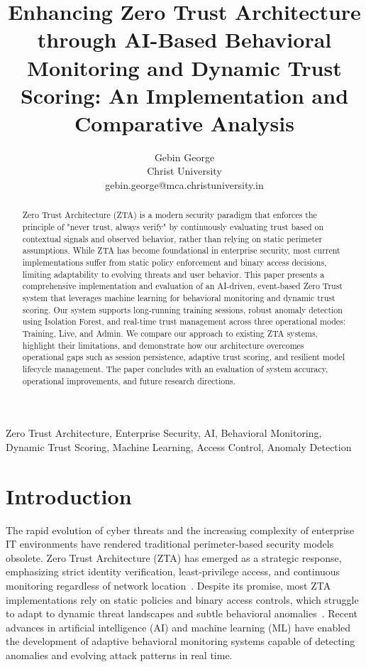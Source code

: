 \documentclass[conference]{IEEEtran}
\begin{document}
\title{Enhancing Zero Trust Architecture through AI-Based Behavioral Monitoring and Dynamic Trust Scoring: An Implementation and Comparative Analysis}

\author{Gebin George\\Christ University\\gebin.george@mca.christuniversity.in}

\maketitle

\begin{abstract}
Zero Trust Architecture (ZTA) is a modern security paradigm that enforces the principle of "never trust, always verify" by continuously evaluating trust based on contextual signals and observed behavior, rather than relying on static perimeter assumptions. While ZTA has become foundational in enterprise security, most current implementations suffer from static policy enforcement and binary access decisions, limiting adaptability to evolving threats and user behavior. This paper presents a comprehensive implementation and evaluation of an AI-driven, event-based Zero Trust system that leverages machine learning for behavioral monitoring and dynamic trust scoring. Our system supports long-running training sessions, robust anomaly detection using Isolation Forest, and real-time trust management across three operational modes: Training, Live, and Admin. We compare our approach to existing ZTA systems, highlight their limitations, and demonstrate how our architecture overcomes operational gaps such as session persistence, adaptive trust scoring, and resilient model lifecycle management. The paper concludes with an evaluation of system accuracy, operational improvements, and future research directions.
\end{abstract}

\begin{IEEEkeywords}
Zero Trust Architecture, Enterprise Security, AI, Behavioral Monitoring, Dynamic Trust Scoring, Machine Learning, Access Control, Anomaly Detection
\end{IEEEkeywords}

\section{Introduction}

The rapid evolution of cyber threats and the increasing complexity of enterprise IT environments have rendered traditional perimeter-based security models obsolete. Zero Trust Architecture (ZTA) has emerged as a strategic response, emphasizing strict identity verification, least-privilege access, and continuous monitoring regardless of network location~\cite{nist800207}. Despite its promise, most ZTA implementations rely on static policies and binary access controls, which struggle to adapt to dynamic threat landscapes and subtle behavioral anomalies~\cite{rose2020zero, yu2021survey}. Recent advances in artificial intelligence (AI) and machine learning (ML) have enabled the development of adaptive behavioral monitoring systems capable of detecting anomalies and evolving attack patterns in real time.
\end{document}
